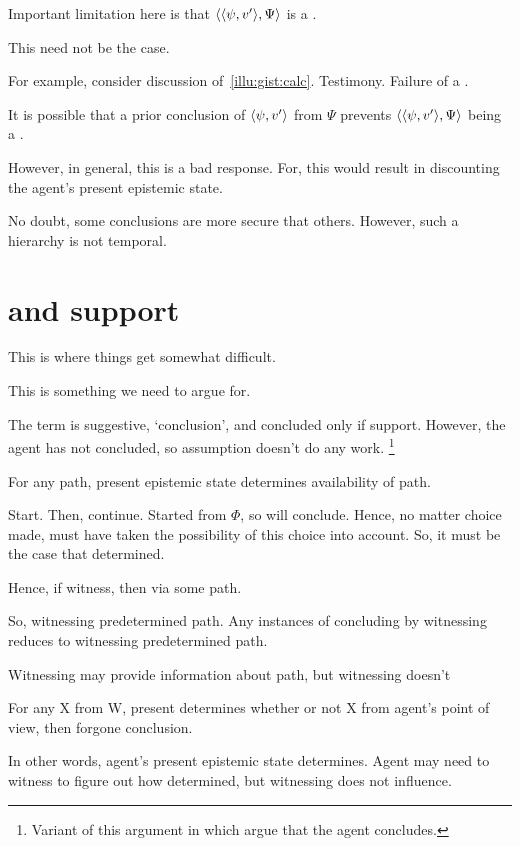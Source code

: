 \begin{note}
  Important limitation here is that \(\langle \langle \psi, v' \rangle, \Psi \rangle\) is a \requ{}.

  This need not be the case.

  For example, consider discussion of~\autoref{illu:gist:calc}.
  Testimony.
  Failure of a \requ{}.

  It is possible that a prior conclusion of \(\langle \psi, v' \rangle\) from \(\Psi\) prevents \(\langle \langle \psi, v' \rangle, \Psi \rangle\) being a \requ{}.

  However, in general, this is a bad response.
  For, this would result in discounting the agent's present epistemic state.

  No doubt, some conclusions are more secure that others.
  However, such a hierarchy is not temporal.
\end{note}

\section{ and support}
\label{cha:fcs:sec:fc3-support}

\begin{note}
  This is where things get somewhat difficult.

  This is something we need to argue for.

  The term is suggestive, `conclusion', and concluded only if support.
  However, the agent has not concluded, so assumption doesn't do any work.%
  \footnote{
    Variant of this argument in which argue that the agent concludes.
  }
\end{note}

\begin{note}
  \begin{proposition}
    For any path, present epistemic state determines availability of path.
  \end{proposition}

  Start.
  Then, continue.
  Started from \(\Phi\), so will conclude.
  Hence, no matter choice made, must have taken the possibility of this choice into account.
  So, it must be the case that determined.

  Hence, if witness, then via some path.

  So, witnessing predetermined path.
  Any instances of concluding by witnessing reduces to witnessing predetermined path.

  Witnessing may provide information about path, but witnessing doesn't 


  For any X from W,
  present determines whether or not X from agent's point of view, then forgone conclusion.

  In other words, agent's present epistemic state determines.
  Agent may need to witness to figure out how determined, but witnessing does not influence.
\end{note}

